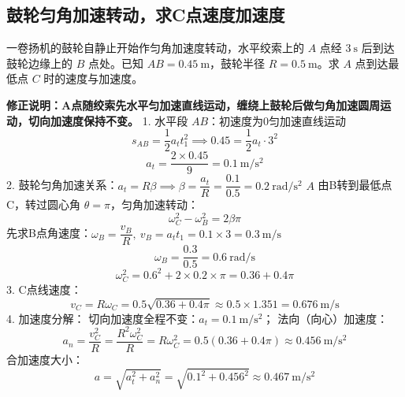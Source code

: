 \subsection{鼓轮匀角加速转动，求C点速度加速度}
\begin{center}
\end{center}
一卷扬机的鼓轮自静止开始作匀角加速度转动，水平绞索上的 $A$ 点经 $3\ \mathrm{s}$ 后到达鼓轮边缘上的 $B$ 点处。已知 $AB=0.45\ \mathrm{m}$，鼓轮半径 $R=0.5\ \mathrm{m}$。求 $A$ 点到达最低点 $C$ 时的速度与加速度。
\begin{solution}
\textbf{修正说明：A点随绞索先水平匀加速直线运动，缠绕上鼓轮后做匀角加速圆周运动，切向加速度保持不变。}
1. 水平段 $AB$：初速度为0匀加速直线运动
\[
s_{AB} = \frac12 a_t t_1^2 \implies 0.45 = \frac12 a_t \cdot 3^2
\]
\[
a_t = \frac{2\times 0.45}{9} = 0.1\ \mathrm{m/s^2}
\]
2. 鼓轮匀角加速关系：$a_t = R \beta \implies \beta = \dfrac{a_t}{R} = \dfrac{0.1}{0.5}=0.2\ \mathrm{rad/s^2}$
$A$ 由B转到最低点C，转过圆心角 $\theta=\pi$，匀角加速转动：
\[
\omega_C^2 - \omega_B^2 = 2\beta \pi
\]
先求B点角速度：$\omega_B = \dfrac{v_B}{R},\ v_B = a_t t_1 = 0.1\times3 = 0.3\ \mathrm{m/s}$
\[
\omega_B = \frac{0.3}{0.5}=0.6\ \mathrm{rad/s}
\]
\[
\omega_C^2 = 0.6^2 + 2\times 0.2 \times \pi = 0.36 + 0.4\pi
\]
3. C点线速度：
\[
v_C = R \omega_C = 0.5 \sqrt{0.36+0.4\pi} \approx 0.5 \times 1.351 = \boxed{0.676\ \mathrm{m/s}}
\]
4. 加速度分解：
切向加速度全程不变：$a_t=0.1\ \mathrm{m/s^2}$；
法向（向心）加速度：
\[
a_n = \frac{v_C^2}{R} = \frac{R^2\omega_C^2}{R}=R\omega_C^2 = 0.5(0.36+0.4\pi)\approx 0.456\ \mathrm{m/s^2}
\]
合加速度大小：
\[
a = \sqrt{a_t^2+a_n^2}
= \sqrt{0.1^2 + 0.456^2}
\approx \boxed{0.467\ \mathrm{m/s^2}}
\]
\end{solution}
